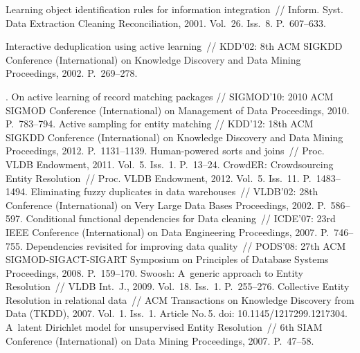 \begin{multicols}{2}
{{\begin{thebibliography}{99}
 Learning object identification rules for information
integration~// Inform. Syst. Data Extraction Cleaning Reconciliation, 2001.
Vol.~26. Iss.~8. P.~607--633.

 Interactive deduplication using active learning~// KDD'02:
8th ACM SIGKDD Conference (International) on Knowledge Discovery and Data Mining
Proceedings, 2002. P.~269--278.

. On active learning of record matching
packages // SIGMOD'10: 2010 ACM SIGMOD Conference (International) on Management of
Data Proceedings, 2010. P.~783--794.
 Active sampling for entity
matching // KDD'12: 18th ACM SIGKDD  Conference (International) on Knowledge Discovery
and Data Mining Proceedings, 2012. P.~1131--1139.
 Human-powered sorts and joins~//
Proc. VLDB Endowment, 2011. Vol.~5. Iss.~1. P.~13--24.
 CrowdER: Crowdsourcing Entity
Resolution~// Proc. VLDB Endowment, 2012. Vol.~5. Iss.~11. P.~1483--1494.
 Eliminating fuzzy duplicates in data
warehouses~// VLDB'02:  28th Conference (International) on Very Large Data Bases
Proceedings, 2002. P.~586--597.
 Conditional functional dependencies for Data
cleaning~// ICDE'07: 23rd IEEE Conference (International) on Data Engineering Proceedings,
2007. P.~746--755.
 Dependencies revisited for improving data quality~// PODS'08:  27th ACM
SIGMOD-SIGACT-SIGART Symposium on Principles of Database Systems Proceedings, 2008.
P.~159--170.
Swoosh: A~generic approach to Entity Resolution~// VLDB Int.~J., 2009.
Vol.~18. Iss.~1. P.~255--276.
 Collective Entity Resolution in relational data~// ACM
Transactions on Knowledge Discovery from Data (TKDD), 2007. Vol.~1. Iss.~1. Article No.\,5.
doi: 10.1145/1217299.1217304.
 A~latent Dirichlet model for unsupervised Entity Resolution~//
6th SIAM Conference (International) on Data Mining Proceedings, 2007. P.~47--58.

\end{thebibliography}}}
\end{multicols}
